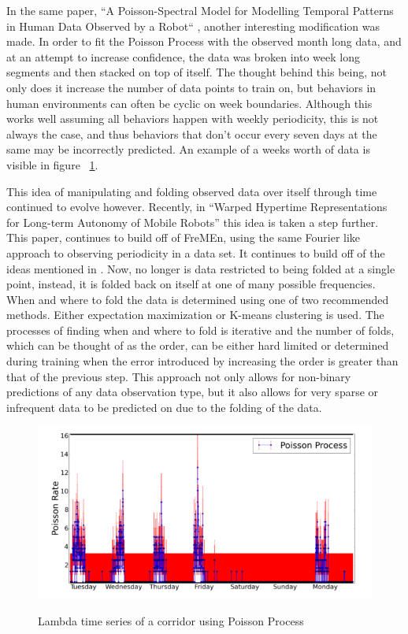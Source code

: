   In the same paper,
  ``A Poisson-Spectral Model for Modelling Temporal Patterns in Human Data Observed by a Robot``
  \cite{Jovan2016}, another interesting modification was made. In order to fit
  the Poisson Process with the observed month long data, and at an attempt to
  increase confidence, the data was broken into week long segments and then
  stacked on top of itself. The thought behind this being, not only does it
  increase the number of data points to train on, but behaviors in human
  environments can often be cyclic on week boundaries. Although this works well
  assuming all behaviors happen with weekly periodicity, this is not always
  the case, and thus behaviors that don't occur every seven days at the same
  may be incorrectly predicted. An example of a weeks worth of data is visible
  in figure ~\ref{figure:PSP}.

  This idea of manipulating and folding observed data over itself through time
  continued to evolve however. Recently, in
  ``Warped Hypertime Representations for Long-term Autonomy of Mobile Robots''
  \cite{krajnik2018} this idea is taken a step further. This paper, continues
  to build off of FreMEn, using the same Fourier like approach to observing
  periodicity in a data set. It continues to build off of the ideas mentioned
  in \cite{Jovan2016}. Now, no longer is data restricted to being folded at a
  single point, instead, it is folded back on itself at one of many possible
  frequencies. When and where to fold the data is determined using one of two
  recommended methods. Either expectation maximization or K-means clustering is
  used. The processes of finding when and where to fold is iterative and the number
  of folds, which can be thought of as the order, can be either hard limited
  or determined during training when the error introduced by increasing the
  order is greater than that of the previous step. This approach not only allows
  for non-binary predictions of any data observation type, but it also allows
  for very sparse or infrequent data to be predicted on due to the folding of
  the data.



  \begin{figure}[!htb]
    \centering
    \includegraphics[width=\linewidth]{images/poisson-spectral-process.png}
    \caption{Lambda time series of a corridor using Poisson Process}
    \cite{Jovan2016}
    \label{figure:PSP}
  \end{figure}


